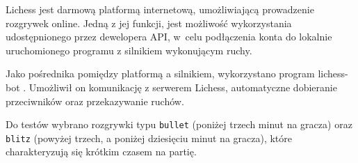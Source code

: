 
Lichess jest darmową platformą internetową, umożliwiającą prowadzenie rozgrywek online.
Jedną z jej funkcji, jest możliwość wykorzystania udostępnionego przez dewelopera API, w~celu podłączenia konta do lokalnie uruchomionego programu z silnikiem wykonującym ruchy.

Jako pośrednika pomiędzy platformą a silnikiem, wykorzystano program lichess-bot \cite*{lichess-bot-docs}.
Umożliwił on komunikację z serwerem Lichess, automatyczne dobieranie przeciwników oraz przekazywanie ruchów.


Do testów wybrano rozgrywki typu \texttt{bullet} (poniżej trzech minut na gracza) oraz \texttt{blitz} (powyżej trzech, a poniżej dziesięciu minut na gracza), które charakteryzują się krótkim czasem na partię.
